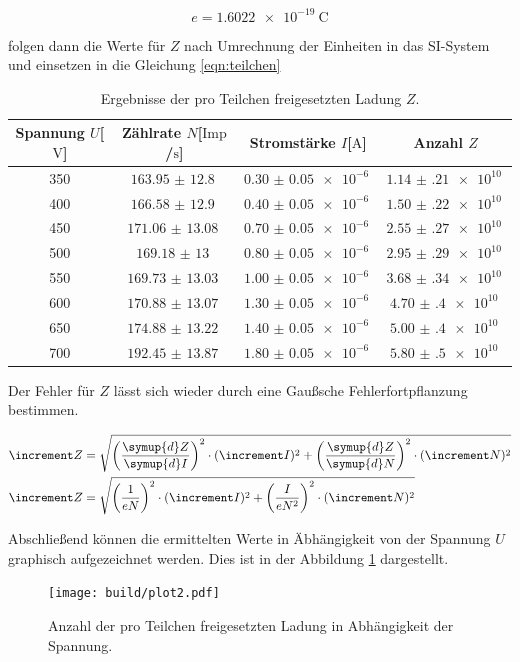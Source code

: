 \begin{equation*}
e = \SI{1.6022e-19}{\coulomb}
\end{equation*}
\begin{flushleft}
folgen dann die Werte für $Z$ nach Umrechnung der Einheiten in das SI-System und einsetzen in die Gleichung 
\eqref{eqn:teilchen}
\end{flushleft}
\begin{table}
\centering
\caption{Ergebnisse der pro Teilchen freigesetzten Ladung $Z$.}
\label{tab:result}
\begin{tabular}{c c c c}
    \toprule
    Spannung $U$[$\si{\volt}$] & Zählrate $N$[$\text{Imp}$/$\si{\second}$] & Stromstärke $I$[$\si{\ampere}$] & Anzahl $Z$ \\
    \midrule
    350  & $\SI{163.95(1280)}{}$ & $\SI{0.30(5)e-6}{}$  & $\SI{1.14(21)e10}{}$\\
    400	 & $\SI{166.58(1290)}{}$ & $\SI{0.40(5)e-6}{}$  & $\SI{1.50(22)e10}{}$\\
    450	 & $\SI{171.06(1308)}{}$ & $\SI{0.70(5)e-6}{}$  & $\SI{2.55(27)e10}{}$\\
    500	 & $\SI{169.18(1300)}{}$ & $\SI{0.80(5)e-6}{}$  & $\SI{2.95(29)e10}{}$\\
    550	 & $\SI{169.73(1303)}{}$ & $\SI{1.00(5)e-6}{}$  & $\SI{3.68(34)e10}{}$\\
    600	 & $\SI{170.88(1307)}{}$ & $\SI{1.30(5)e-6}{}$  & $\SI{4.70(40)e10}{}$\\
    650	 & $\SI{174.88(1322)}{}$ & $\SI{1.40(5)e-6}{}$  & $\SI{5.00(40)e10}{}$\\
    700	 & $\SI{192.45(1387)}{}$ & $\SI{1.80(5)e-6}{}$  & $\SI{5.80(50)e10}{}$\\
    \bottomrule
\end{tabular}
\end{table}

Der Fehler für $Z$ lässt sich wieder durch eine Gaußsche Fehlerfortpflanzung bestimmen.

\begin{align*}
\increment Z &= \sqrt{\left( \frac{\symup{d}Z}{\symup{d}I} \right)^{2} \cdot (\increment I)^{2} 
+ \left( \frac{\symup{d}Z}{\symup{d}N} \right)^{2} \cdot (\increment N)^{2}
}\\
\increment Z &=\sqrt{\left( \frac{1}{e N} \right)^{2} \cdot (\increment I)^{2} 
+ \left( \frac{I}{e N^{2}} \right)^{2} \cdot (\increment N)^{2}
}
\end{align*}
\begin{flushleft}
Abschließend können die ermittelten Werte in Äbhängigkeit von der Spannung $U$ graphisch aufgezeichnet werden.
Dies ist in der Abbildung \ref{fig:plot2} dargestellt.
\end{flushleft}
\begin{figure}[h]
  \centering
  \texttt{[image: build/plot2.pdf]}
  \caption{Anzahl der pro Teilchen freigesetzten Ladung in Abhängigkeit der Spannung.}
  \label{fig:plot2}
\end{figure}